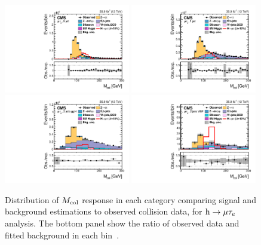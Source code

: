\begin{figure}[!htpb]\centering
 \includegraphics[width=0.49\textwidth]{plots_and_figures/chapter8/h125/0jetmcol.pdf}
 \includegraphics[width=0.49\textwidth]{plots_and_figures/chapter8/h125/1jetmcol.pdf} \\
 \includegraphics[width=0.49\textwidth]{plots_and_figures/chapter8/h125/2jetggmcol.pdf}
 \includegraphics[width=0.49\textwidth]{plots_and_figures/chapter8/h125/2jetvbmcol.pdf} 
\caption{Distribution of $M_{\text{col}}$ response in each category comparing signal and background estimations to observed collision data, for $\text{h} \to \mu \tau_{e}$ analysis. The bottom panel show the ratio of observed data and fitted background in each bin~\cite{HIG-17-001}.}
 \label{fig:mcol_dist_hmue}
\end{figure}


